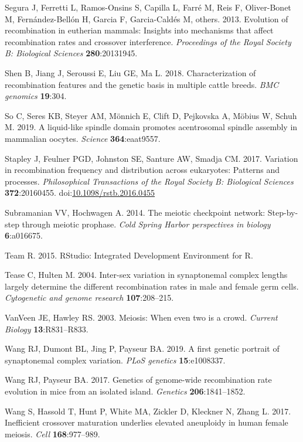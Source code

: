 \documentclass[
]{article}
\begin{document}
\leavevmode\hypertarget{ref-segura2013}{}%
Segura J, Ferretti L, Ramos-Onsins S, Capilla L, Farré M, Reis F,
Oliver-Bonet M, Fernández-Bellón H, Garcia F, Garcia-Caldés M, others.
2013. Evolution of recombination in eutherian mammals: Insights into
mechanisms that affect recombination rates and crossover interference.
\emph{Proceedings of the Royal Society B: Biological Sciences}
\textbf{280}:20131945.

\leavevmode\hypertarget{ref-Shen2018_cattle}{}%
Shen B, Jiang J, Seroussi E, Liu GE, Ma L. 2018. Characterization of
recombination features and the genetic basis in multiple cattle breeds.
\emph{BMC genomics} \textbf{19}:304.

\leavevmode\hypertarget{ref-So2019}{}%
So C, Seres KB, Steyer AM, Mönnich E, Clift D, Pejkovska A, Möbius W,
Schuh M. 2019. A liquid-like spindle domain promotes acentrosomal
spindle assembly in mammalian oocytes. \emph{Science}
\textbf{364}:eaat9557.

\leavevmode\hypertarget{ref-stapley_variation_2017}{}%
Stapley J, Feulner PGD, Johnston SE, Santure AW, Smadja CM. 2017.
Variation in recombination frequency and distribution across eukaryotes:
Patterns and processes. \emph{Philosophical Transactions of the Royal
Society B: Biological Sciences} \textbf{372}:20160455.
doi:\href{https://doi.org/10.1098/rstb.2016.0455}{10.1098/rstb.2016.0455}

\leavevmode\hypertarget{ref-subramanian2014}{}%
Subramanian VV, Hochwagen A. 2014. The meiotic checkpoint network:
Step-by-step through meiotic prophase. \emph{Cold Spring Harbor
perspectives in biology} \textbf{6}:a016675.

\leavevmode\hypertarget{ref-Rstudio}{}%
Team R. 2015. RStudio: Integrated Development Environment for R.

\leavevmode\hypertarget{ref-tease2004}{}%
Tease C, Hulten M. 2004. Inter-sex variation in synaptonemal complex
lengths largely determine the different recombination rates in male and
female germ cells. \emph{Cytogenetic and genome research}
\textbf{107}:208--215.

\leavevmode\hypertarget{ref-vanVeen2003}{}%
VanVeen JE, Hawley RS. 2003. Meiosis: When even two is a crowd.
\emph{Current Biology} \textbf{13}:R831--R833.

\leavevmode\hypertarget{ref-wang2019_SC}{}%
Wang RJ, Dumont BL, Jing P, Payseur BA. 2019. A first genetic portrait
of synaptonemal complex variation. \emph{PLoS genetics}
\textbf{15}:e1008337.

\leavevmode\hypertarget{ref-Wang2017island}{}%
Wang RJ, Payseur BA. 2017. Genetics of genome-wide recombination rate
evolution in mice from an isolated island. \emph{Genetics}
\textbf{206}:1841--1852.

\leavevmode\hypertarget{ref-wang2017inefficient}{}%
Wang S, Hassold T, Hunt P, White MA, Zickler D, Kleckner N, Zhang L.
2017. Inefficient crossover maturation underlies elevated aneuploidy in
human female meiosis. \emph{Cell} \textbf{168}:977--989.
\end{document}
